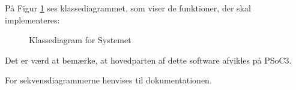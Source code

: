 På Figur \ref{fig:KlasseDiagram} ses klassediagrammet, som viser de funktioner, der skal implementeres:

\begin{figure}[H]
\centering
{}
\caption[Diagram]{Klassediagram for Systemet}
\label{fig:KlasseDiagram}
\end{figure}

Det er værd at bemærke, at hovedparten af dette software afvikles på PSoC3.

For sekvensdiagrammerne henvises til dokumentationen.

